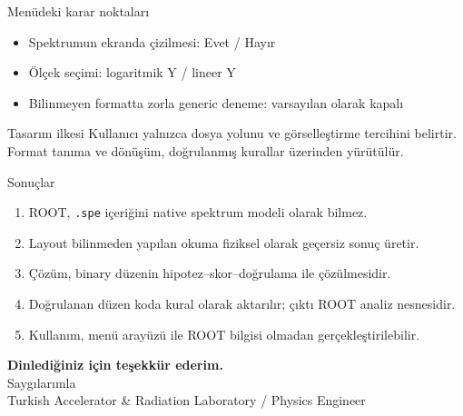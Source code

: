 \documentclass[aspectratio=169,11pt]{beamer}
\begin{document}
\begin{frame}{Menüdeki karar noktaları}
  \begin{itemize}
    \item Spektrumun ekranda çizilmesi: Evet / Hayır
    \item Ölçek seçimi: logaritmik Y / lineer Y
    \item Bilinmeyen formatta zorla generic deneme: varsayılan olarak kapalı
  \end{itemize}

  \vspace{0.7em}
  \begin{exampleblock}{Tasarım ilkesi}
    Kullanıcı yalnızca dosya yolunu ve görselleştirme tercihini belirtir.\\
    Format tanıma ve dönüşüm, doğrulanmış kurallar üzerinden yürütülür.
  \end{exampleblock}
\end{frame}

\begin{frame}{Sonuçlar}
  \begin{enumerate}
    \item ROOT, \texttt{.spe} içeriğini native spektrum modeli olarak bilmez.
    \item Layout bilinmeden yapılan okuma fiziksel olarak geçersiz sonuç üretir.
    \item Çözüm, binary düzenin hipotez--skor--doğrulama ile çözülmesidir.
    \item Doğrulanan düzen koda kural olarak aktarılır; çıktı ROOT analiz nesnesidir.
    \item Kullanım, menü arayüzü ile ROOT bilgisi olmadan gerçekleştirilebilir.
  \end{enumerate}
\end{frame}

\begin{frame}[plain]
  \begin{center}
    \vspace{2.2cm}
    {\Large\bfseries\textcolor{ustnavy}{Dinlediğiniz için teşekkür ederim.}}\\[1.4em]
    {\large\textcolor{ustgray}{Saygılarımla}}\\[1.2em]
    {\normalsize\textcolor{ustteal}{Turkish Accelerator \& Radiation Laboratory / Physics Engineer}}
  \end{center}
\end{frame}
\end{document}
